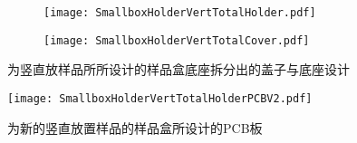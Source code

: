 \begin{figure}[h]
  \centering%
  \begin{subfigure}{0.4\textwidth}
    \texttt{[image: SmallboxHolderVertTotalHolder.pdf]}
  \end{subfigure}%
  \hfill
  \begin{subfigure}{0.4\textwidth}
    \texttt{[image: SmallboxHolderVertTotalCover.pdf]}
  \end{subfigure}
  \caption{为竖直放样品所所设计的样品盒底座拆分出的盖子与底座设计}
  \label{fig:newVertiSampleBox}
\end{figure}

                  


\begin{figure}[h]
  \centering%
  \texttt{[image: SmallboxHolderVertTotalHolderPCBV2.pdf]}
  \caption{为新的竖直放置样品的样品盒所设计的PCB板}
  \label{fig:SmallboxHolderVertTotalHolderPCBV2}
\end{figure}










